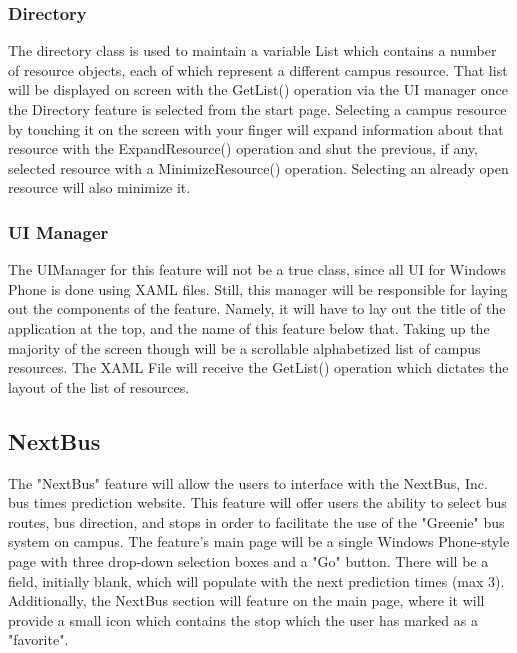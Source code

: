 \documentclass[pdftex,12pt,letter]{article}
\begin{document}
\subsubsection{Directory}
The directory class is used to maintain a variable List which contains a number of resource objects, each of which represent a different campus resource. That list will be displayed on screen with the GetList() operation via the UI manager once the Directory feature is selected from the start page. Selecting a campus resource by touching it on the screen with your finger will expand information about that resource with the ExpandResource() operation and shut the previous, if any, selected resource with a MinimizeResource() operation. Selecting an already open resource will also minimize it.
\subsubsection{UI Manager}
The UIManager for this feature will not be a true class, since all UI for Windows Phone is done using XAML files. Still, this manager will be responsible for laying out the components of the feature. Namely, it will have to lay out the title of the application at the top, and the name of this feature below that. Taking up the majority of the screen though will be a scrollable alphabetized list of campus resources. The XAML File will receive the GetList() operation which dictates the layout of the list of resources.
\subsection{NextBus}
The "NextBus" feature will allow the users to interface with the NextBus, Inc. bus times prediction website. This feature will offer users the ability to select bus routes, bus direction, and stops in order to facilitate the use of the "Greenie" bus system on campus. The feature's main page will be a single Windows Phone-style page with three drop-down selection boxes and a "Go" button. There will be a field, initially blank, which will populate with the next prediction times (max 3). Additionally, the NextBus section will feature on the main page, where it will provide a small icon which contains the stop which the user has marked as a "favorite".
\end{document}

